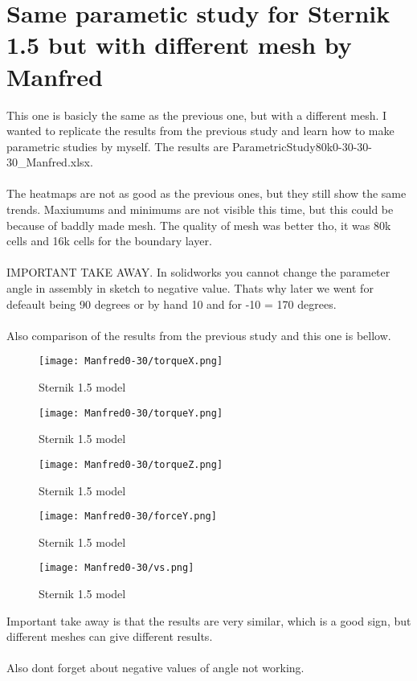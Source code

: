 \section{Same parametic study for Sternik 1.5 but with different mesh by Manfred}
This one is basicly the same as the previous one, but with a different mesh. I wanted to replicate
the results from the previous study and learn how to make parametric studies by myself. The results
are ParametricStudy80k0-30-30-30\_Manfred.xlsx. \\\\
The heatmaps are not as good as the previous ones, but they still show the same trends. 
Maxiumums and minimums are not visible this time, but this could be because of baddly made mesh.
The quality of mesh was better tho, it was 80k cells and 16k cells for the boundary layer.\\\\
IMPORTANT TAKE AWAY. In solidworks you cannot change the parameter angle in assembly in sketch to 
negative value. Thats why later we went for defeault being 90 degrees or by hand 10 and for 
-10 = 170 degrees. \\\\
Also comparison of the results from the previous study and this one is bellow.
\begin{figure}[H]
    \centering
    \texttt{[image: Manfred0-30/torqueX.png]}
    \caption{Sternik 1.5 model}
\end{figure}

\begin{figure}[H]
    \centering
    \texttt{[image: Manfred0-30/torqueY.png]}
    \caption{Sternik 1.5 model}
\end{figure}

\begin{figure}[H]
    \centering
    \texttt{[image: Manfred0-30/torqueZ.png]}
    \caption{Sternik 1.5 model}
\end{figure}

\begin{figure}[H]
    \centering
    \texttt{[image: Manfred0-30/forceY.png]}
    \caption{Sternik 1.5 model}
\end{figure}

\begin{figure}[H]
    \centering
    \texttt{[image: Manfred0-30/vs.png]}
    \caption{Sternik 1.5 model}
\end{figure}
Important take away is that the results are very similar, which is a good sign, but different 
meshes can give different results. \\\\
Also dont forget about negative values of angle not working.

